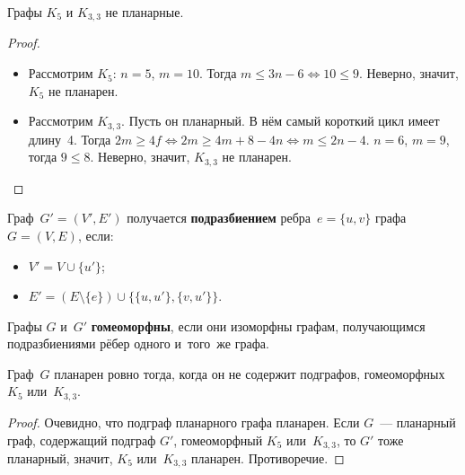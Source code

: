 \begin{theorem}
Графы $K_5$ и $K_{3,3}$ не планарные.
\end{theorem}
\begin{proof}
\begin{itemize}
	\item Рассмотрим $K_5$: $n = 5$, $m = 10$.
	Тогда $m \leqslant 3n - 6 \Leftrightarrow 10 \leqslant 9$.
	Неверно, значит, $K_5$ не планарен.
	\item Рассмотрим $K_{3,3}$.
	Пусть он планарный.
	В нём самый короткий цикл имеет длину~4.
	Тогда $2m \geqslant 4f \Leftrightarrow 2m \geqslant 4m + 8 - 4n \Leftrightarrow m \leqslant 2n - 4$.
	$n = 6$, $m = 9$, тогда $9 \leqslant 8$.
	Неверно, значит, $K_{3,3}$ не планарен.
\end{itemize}
\end{proof}

\begin{definition}
Граф~$G' = (V', E')$ получается \textbf{подразбиением} ребра~$e = \{ u, v \}$ графа~$G = (V, E)$, если:
\begin{itemize}
	\item $V' = V \cup \{ u' \}$;
	\item $E' = (E \setminus \{ e \}) \cup \{ \{ u, u' \}, \{ v, u' \} \}$.
\end{itemize}
\end{definition}

\begin{definition}
Графы $G$ и~$G'$ \textbf{гомеоморфны}, если они изоморфны графам, получающимся подразбиениями рёбер одного и~того~же графа.
\end{definition}

\begin{theorem}
Граф~$G$ планарен ровно тогда, когда он не содержит подграфов, гомеоморфных $K_5$ или~$K_{3,3}$.
\end{theorem}
\begin{proof}
Очевидно, что подграф планарного графа планарен.
Если $G$~--- планарный граф, содержащий подграф $G'$, гомеоморфный $K_5$ или~$K_{3,3}$, то $G'$ тоже планарный, значит, $K_5$ или~$K_{3,3}$ планарен.
Противоречие.
\end{proof}
